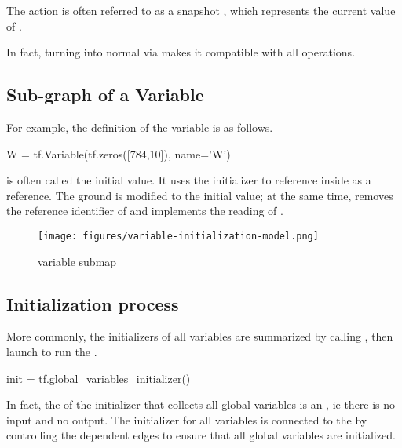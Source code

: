 \begin{content}
The  action  is often referred to as a snapshot , which represents the current value of .

In fact, turning  into normal  via  makes it compatible with all  operations.


\subsection{Sub-graph of a Variable}
For example, the definition of the variable  is as follows.

\begin{leftbar}
\begin{python}
W = tf.Variable(tf.zeros([784,10]), name='W')
\end{python}
\end{leftbar}

 is often called the initial value. It uses the initializer  to reference  inside  as a reference. The ground is modified to the initial value; at the same time,  removes the reference identifier of  and implements the reading of .

\begin{figure}[!h]
  \centering
  \texttt{[image: figures/variable-initialization-model.png]}
  \caption{variable submap}
  \label{fig:variable-initialization-model}
\end{figure}


\subsection{Initialization process}
More commonly, the initializers of all variables are summarized by calling , then launch  to run the .

\begin{leftbar}
\begin{python}
init = tf.global_variables_initializer()
\end{python}
\end{leftbar}

In fact, the  of the initializer that collects all global variables is an , ie there is no input and no output. The initializer for all variables is connected to the  by controlling the dependent edges to ensure that all global variables are initialized.


\end{content}
